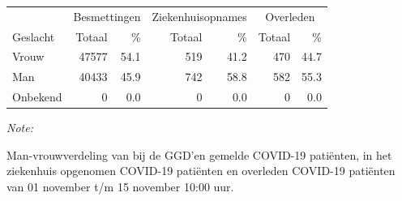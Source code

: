 \documentclass[
  english,
  man,floatsintext]{apa6}
\begin{document}
\begin{table}[H]
\centering\begingroup\fontsize{11}{13}\selectfont

\begin{threeparttable}
\begin{tabular}{lrrrrrr}
\toprule
\multicolumn{1}{c}{ } & \multicolumn{2}{c}{Besmettingen} & \multicolumn{2}{c}{Ziekenhuisopnames} & \multicolumn{2}{c}{Overleden} \\
\cmidrule(l{3pt}r{3pt}){2-3} \cmidrule(l{3pt}r{3pt}){4-5} \cmidrule(l{3pt}r{3pt}){6-7}
Geslacht & Totaal & \% & Totaal & \% & Totaal & \%\\
\midrule
Vrouw & 47577 & 54.1 & 519 & 41.2 & 470 & 44.7\\
Man & 40433 & 45.9 & 742 & 58.8 & 582 & 55.3\\
Onbekend & 0 & 0.0 & 0 & 0.0 & 0 & 0.0\\
\bottomrule
\end{tabular}
\begin{tablenotes}
\item \textit{Note: } 
\item Man-vrouwverdeling van bij de GGD’en gemelde COVID-19 patiënten, in het ziekenhuis opgenomen COVID-19 patiënten en overleden COVID-19 patiënten van 01 november t/m 15 november 10:00 uur.
\end{tablenotes}
\end{threeparttable}
\endgroup{}
\end{table}
\newpage
\end{document}

